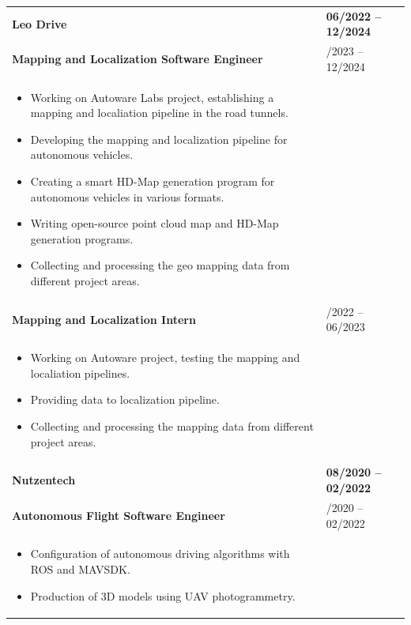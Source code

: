 \documentclass[10pt,a4paper]{article}
\begin{document}
\begin{longtable}{@{} p{} | >{\centering\arraybackslash}p{} @{}}
  \vspace{-2pt}
  \textbf{Leo Drive} & \textbf{06/2022 -- 12/2024} \\
  \vspace{-5pt}
  \quad \textbf{\color{cvblue}Mapping and Localization Software Engineer} & 07/2023 -- 12/2024 \\ [-5pt]
  \begin{itemize}
    \item Working on Autoware Labs project, establishing a mapping and localiation pipeline in the road tunnels.
    \item Developing the mapping and localization pipeline for autonomous vehicles.
    \item Creating a smart HD-Map generation program for autonomous vehicles in various formats.
    \item Writing open-source point cloud map and HD-Map generation programs.
    \item Collecting and processing the geo mapping data from different project areas.
  \end{itemize} & \\ [10pt]

  \vspace{-5pt}
  \quad \textbf{\color{cvblue}Mapping and Localization Intern} & 06/2022 -- 06/2023 \\ [-5pt]
  \begin{itemize}
    \item Working on Autoware project, testing the mapping and localiation pipelines.
    \item Providing data to localization pipeline.
    \item Collecting and processing the mapping data from different project areas.
  \end{itemize} & \\[ 10pt]

  \vspace{-2pt}
  \textbf{Nutzentech} & \textbf{08/2020 -- 02/2022} \\ [5pt]
  \quad \textbf{\color{cvblue}Autonomous Flight Software Engineer} & 08/2020 -- 02/2022 \\ [-5pt]
  \begin{itemize}
    \item Configuration of autonomous driving algorithms with ROS and MAVSDK.
    \item Production of 3D models using UAV photogrammetry.
  \end{itemize} & \\ [10pt]


\end{longtable}
\end{document}

